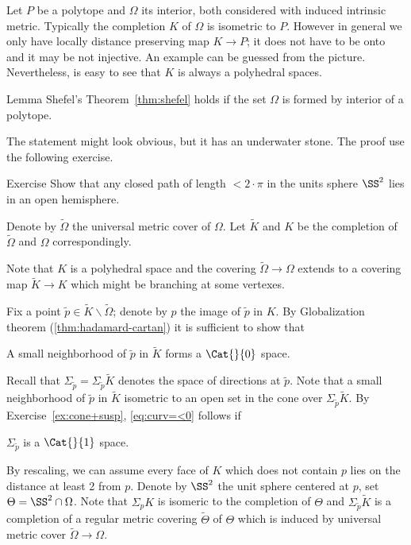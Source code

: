 Let $P$ be a polytope and $\Omega$ its interior,
both considered with induced intrinsic metric.
Typically the completion $K$ of $\Omega$ 
is isometric to $P$.
However in general
we only have locally distance preserving map $K\to P$;
it does not have to be onto and it may be not injective. 
An example can be guessed from the picture.
Nevertheless, is easy to see that $K$ is always a polyhedral spaces.


\begin{thm}{Lemma}\label{lem:poly-shefel}
Shefel's Theorem~\ref{thm:shefel} holds if the set $\Omega$ is formed by interior of a polytope.
\end{thm}

The statement might look obvious, but it has an underwater stone.
The proof use the following exercise.

\begin{thm}{Exercise}\label{ex:hemisphere}
Show that any closed path of length $<2\cdot \pi$  in the units sphere $\SS^2$ lies in an open  hemisphere. 
\end{thm}

Denote by $\tilde\Omega$ the universal metric cover of $\Omega$.
Let $\tilde K$ and $K$ be the completion of $\tilde\Omega$ and  $\Omega$ correspondingly.

Note that $K$ is a polyhedral space and the covering $\tilde\Omega\to\Omega$ extends to a covering map $\tilde K\to K$ which might be branching at some vertexes.

Fix a point $\tilde p\in \tilde K\backslash\tilde\Omega$; 
denote by $p$ the image of $\tilde p$ in $K$.
By Globalization theorem (\ref{thm:hadamard-cartan}) it is sufficient to show that 

\begin{clm}{}\label{eq:curv=<0}
A small neighborhood of $\tilde p$ in $\tilde K$ forms a $\Cat{}{0}$ space.
\end{clm}

Recall that $\Sigma_{\tilde p}=\Sigma_{\tilde p}\tilde K$ denotes the space of directions at $\tilde p$.
Note that a small neighborhood of $\tilde p$ in $\tilde K$
isometric to an open set in the cone over $\Sigma_{\tilde p}\tilde K$.
By Exercise~\ref{ex:cone+susp}, \ref{eq:curv=<0} follows if 

\begin{clm}{}\label{eq:curv=<1}
$\Sigma_{\tilde p}$ is a $\Cat{}{1}$ space.
\end{clm}

By  rescaling, we can assume every face of $K$ which does not contain $p$ lies on the distance at least 2 from $p$.
Denote by $\SS^2$ the unit sphere centered at $p$,
set $\Theta=\SS^2\cap\Omega$.
Note that $\Sigma_pK$ is isomeric to the completion of $\Theta$
and $\Sigma_{\tilde p}\tilde K$ is a completion of a regular metric covering $\tilde\Theta$ of $\Theta$ which is induced by universal metric cover $\tilde \Omega\to \Omega$.

